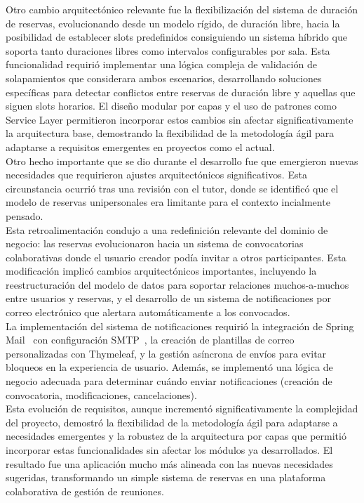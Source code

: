 Otro cambio arquitectónico relevante fue la flexibilización del sistema de duración de reservas, evolucionando desde un modelo rígido, de duración libre, hacia la posibilidad de establecer slots predefinidos consiguiendo un sistema híbrido que soporta tanto duraciones libres como intervalos configurables por sala. Esta funcionalidad requirió implementar una lógica compleja de validación de solapamientos que considerara ambos escenarios, desarrollando soluciones específicas para detectar conflictos entre reservas de duración libre y aquellas que siguen slots horarios. El diseño modular por capas y el uso de patrones como Service Layer permitieron incorporar estos cambios sin afectar significativamente la arquitectura base, demostrando la flexibilidad de la metodología ágil para adaptarse a requisitos emergentes en proyectos como el actual.\\

Otro hecho importante que se dio durante el desarrollo fue que emergieron nuevas necesidades que requirieron ajustes arquitectónicos significativos. Esta circunstancia ocurrió tras una revisión con el tutor, donde se identificó que el modelo de reservas unipersonales era limitante para el contexto incialmente pensado.\\
Esta retroalimentación condujo a una redefinición relevante del dominio de negocio: las reservas evolucionaron hacia un sistema de convocatorias colaborativas donde el usuario creador podía invitar a otros participantes. Esta modificación implicó cambios arquitectónicos importantes, incluyendo la reestructuración del modelo de datos para soportar relaciones muchos-a-muchos entre usuarios y reservas, y el desarrollo de un sistema de notificaciones por correo electrónico que alertara automáticamente a los convocados.\\
La implementación del sistema de notificaciones requirió la integración de Spring Mail~\cite{spring-mail} con configuración SMTP~\cite{smtp}, la creación de plantillas de correo personalizadas con Thymeleaf, y la gestión asíncrona de envíos para evitar bloqueos en la experiencia de usuario. Además, se implementó una lógica de negocio adecuada para determinar cuándo enviar notificaciones (creación de convocatoria, modificaciones, cancelaciones).\\
Esta evolución de requisitos, aunque incrementó significativamente la complejidad del proyecto, demostró la flexibilidad de la metodología ágil para adaptarse a necesidades emergentes y la robustez de la arquitectura por capas que permitió incorporar estas funcionalidades sin afectar los módulos ya desarrollados. El resultado fue una aplicación mucho más alineada con las nuevas necesidades sugeridas, transformando un simple sistema de reservas en una plataforma colaborativa de gestión de reuniones.

